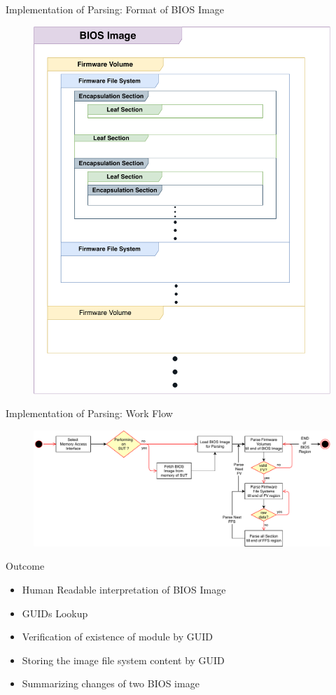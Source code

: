 
\begin{frame}{Implementation of Parsing: Format of BIOS Image}
	\begin{figure}[htbp]
		\centering
		\includegraphics[width=0.5\linewidth]{Im/figures/bios-as-filesystem.pdf}
	\end{figure}
\end{frame}

\begin{frame}{Implementation of Parsing: Work Flow}
	\begin{figure}[htbp]
		\centering
		\includegraphics[width=\linewidth]{Im/figures/uefi-parser.pdf}
	\end{figure}
\end{frame}

\begin{frame}{Outcome}
	\begin{itemize}
		\item Human Readable interpretation of BIOS Image
		\item GUIDs Lookup
		\item Verification of existence of module by GUID
		\item Storing the image file system content by GUID
		\item Summarizing changes of two BIOS image
	\end{itemize}
\end{frame}